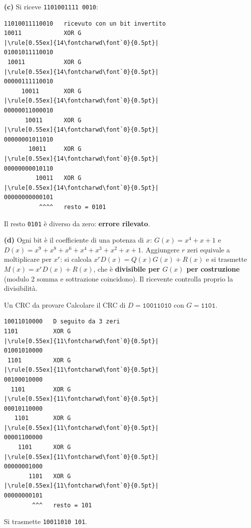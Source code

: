 \textbf{(c)} Si riceve \texttt{11010\textcolor{netred}{0}1111\,0010}:
\begin{lstlisting}[autogobble=false, escapechar=|]
11010011110010   ricevuto con un bit invertito
10011            XOR G
|\rule[0.55ex]{14\fontcharwd\font`0}{0.5pt}|
01001011110010
 10011           XOR G
|\rule[0.55ex]{14\fontcharwd\font`0}{0.5pt}|
00000111110010
     10011       XOR G
|\rule[0.55ex]{14\fontcharwd\font`0}{0.5pt}|
00000011000010
      10011      XOR G
|\rule[0.55ex]{14\fontcharwd\font`0}{0.5pt}|
00000001011010
       10011     XOR G
|\rule[0.55ex]{14\fontcharwd\font`0}{0.5pt}|
00000000010110
         10011   XOR G
|\rule[0.55ex]{14\fontcharwd\font`0}{0.5pt}|
00000000000101
          ^^^^   resto = 0101
\end{lstlisting}
Il resto \texttt{0101} è diverso da zero: \textbf{errore rilevato}.

\textbf{(d)} Ogni bit è il coefficiente di una potenza di $x$: $G(x) = x^4 + x + 1$ e $D(x) = x^9 + x^8 + x^6 + x^4 + x^3 + x^2 + x + 1$.
Aggiungere $r$ zeri equivale a moltiplicare per $x^r$: si calcola $x^r D(x) = Q(x)G(x) + R(x)$ e si trasmette $M(x) = x^r D(x) + R(x)$,
che è \textbf{divisibile per $G(x)$ per costruzione} (modulo 2 somma e sottrazione coincidono). Il ricevente controlla proprio la
divisibilità.


\begin{esercizio}{Un CRC da provare}
Calcolare il CRC di $D = \texttt{10011010}$ con $G = \texttt{1101}$.
\end{esercizio}

\svolgimento
\begin{lstlisting}[autogobble=false, escapechar=|]
10011010000   D seguito da 3 zeri
1101          XOR G
|\rule[0.55ex]{11\fontcharwd\font`0}{0.5pt}|
01001010000
 1101         XOR G
|\rule[0.55ex]{11\fontcharwd\font`0}{0.5pt}|
00100010000
  1101        XOR G
|\rule[0.55ex]{11\fontcharwd\font`0}{0.5pt}|
00010110000
   1101       XOR G
|\rule[0.55ex]{11\fontcharwd\font`0}{0.5pt}|
00001100000
    1101      XOR G
|\rule[0.55ex]{11\fontcharwd\font`0}{0.5pt}|
00000001000
       1101   XOR G
|\rule[0.55ex]{11\fontcharwd\font`0}{0.5pt}|
00000000101
        ^^^   resto = 101
\end{lstlisting}
Si trasmette \texttt{10011010\,101}.


